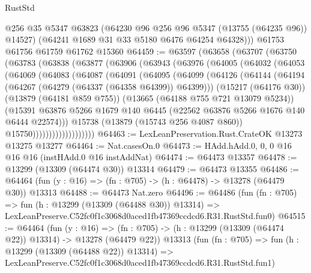 \begin{lexlean}{RustStd}
\begin{coremodule}
        @256
        @35
        @5347
        @63823
        (@64230 @96 @256 @96 @5347 (@13755 (@64235 @96)) @14527)
        (@64241 @1689 @31 @33 @5180 @6476 @64254 @64328)))
    @61753
    @61756
    @61759
    @61762
    @15360
@64459 := @63597
    (@63658
      (@63707
        (@63750
          (@63783
            (@63838
              (@63877
                (@63906
                  (@63943
                    (@63976
                      (@64005
                        (@64032
                          (@64053
                            (@64069
                              (@64083
                                (@64087
                                  (@64091
                                    (@64095
                                      (@64099
                                        (@64126
                                          (@64144
                                            (@64194
                                              (@64267 (@64279 (@64337 (@64358 @64399)) @64399)))
                                            (@15217 (@64176 @30))
                                            (@13879 (@64181 @859 @755))
                                            (@13665 (@64188 @755 @721 @13079 @5234))
                                            (@15391
                                              @63876
                                              @5266
                                              @1679
                                              @140
                                              @6445
                                              (@22562 @63876 @5266 @1676 @140 @6444 @22574)))
                                          @15738
                                          (@13879 (@15743 @256 @4087 @860))
                                          @15750)))))))))))))))))))
@64463 := LexLeanPreservation.Rust.CrateOK @13273 @13275 @13277
@64464 := Nat.casesOn.{0}
@64473 := HAdd.hAdd.{0, 0, 0} @16 @16 @16 (instHAdd.{0} @16 instAddNat)
@64474 := @64473 @13357
@64478 := @13299 (@13309 (@64474 @30)) @13314
@64479 := @64473 @13355
@64486 := @64464 (fun (y : @16) => (fn : @705) -> (h : @64478) -> @13278 (@64479 @30)) @13313
@64488 := @64473 Nat.zero
@64496 := @64486
    (fun (fn : @705) =>
    fun (h : @13299 (@13309 (@64488 @30)) @13314) =>
    LexLeanPreserve.C52fc0f1c3068d0aced1fb47369ccdcd6.R31.RustStd.fun0)
@64515 := @64464
    (fun (y : @16) =>
    (fn : @705) -> (h : @13299 (@13309 (@64474 @22)) @13314) -> @13278 (@64479 @22))
    @13313
    (fun (fn : @705) =>
    fun (h : @13299 (@13309 (@64488 @22)) @13314) =>
    LexLeanPreserve.C52fc0f1c3068d0aced1fb47369ccdcd6.R31.RustStd.fun1)

\end{coremodule}
\end{lexlean}
